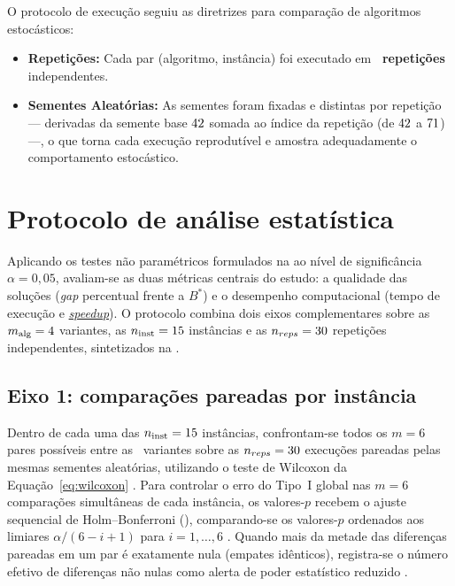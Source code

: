 O protocolo de execução seguiu as diretrizes para comparação de algoritmos estocásticos:

\begin{itemize}
      \item
            \textbf{Repetições:} Cada par (algoritmo, instância) foi executado em \textbf{\totalrepeticoes\ repetições} independentes.
      \item
            \textbf{Sementes Aleatórias:} As sementes foram fixadas e distintas por repetição --- derivadas da semente base \(42\) somada ao índice da repetição (de \(42\) a \(71\)) ---, o que torna cada execução reprodutível e amostra adequadamente o comportamento estocástico.
\end{itemize}

\section{Protocolo de análise estatística}\label{sec-34-protocolo-estatistico}

Aplicando os testes não paramétricos formulados na  \autocite{demsar2006statistical} ao nível de significância \(\alpha = 0{,}05\), avaliam-se as duas métricas centrais do estudo: a qualidade das soluções (\emph{gap} percentual frente a \(B^*\)) e o desempenho computacional (tempo de execução e \hyperlink{term:speedup}{\emph{speedup}}).
O protocolo combina dois eixos complementares sobre as \(m_{\text{alg}} = 4\) variantes, as \(n_{\text{inst}} = 15\) instâncias e as \(n_{reps} = 30\) repetições independentes, sintetizados na .

\subsection{Eixo 1: comparações pareadas por instância}\label{sec-341-eixo1}

Dentro de cada uma das \(n_{\text{inst}} = 15\) instâncias, confrontam-se todos os \(m = 6\) pares possíveis entre as \totalvariantes\ variantes sobre as \(n_{reps} = 30\) execuções pareadas pelas mesmas sementes aleatórias, utilizando o teste de Wilcoxon da Equação~\eqref{eq:wilcoxon} \autocite{wilcoxon1945individual}.
Para controlar o erro do Tipo~I global nas \(m = 6\) comparações simultâneas de cada instância, os valores-\(p\) recebem o ajuste sequencial de Holm--Bonferroni (), comparando-se os valores-\(p\) ordenados aos limiares \(\alpha / (6 - i + 1)\) para \(i = 1, \dots, 6\) \autocite{holm1979simple}.
Quando mais da metade das diferenças pareadas em um par é exatamente nula (empates idênticos), registra-se o número efetivo de diferenças não nulas como alerta de poder estatístico reduzido \autocite[Seção~3.1.3]{demsar2006statistical}.

